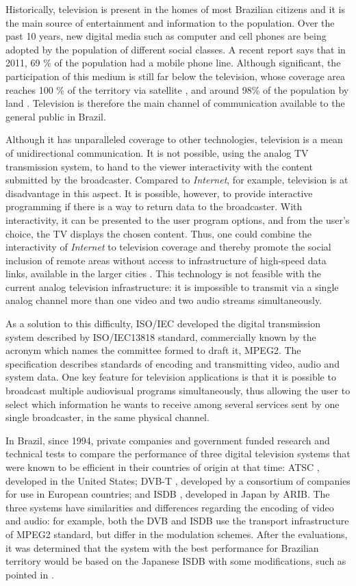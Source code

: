 \documentclass[
	12pt,				%
	openright,			%
	twoside,			%
	a4paper,			%
	brazil,
	french,				%
	english
	]{abntex2}
\begin{document}
Historically, television is present in the homes of most Brazilian citizens and it is the main source of entertainment and information to the population. Over the past 10 years, new digital media such as computer and cell phones are being adopted by the population of different social classes. A recent report \cite{pnad2011} says that in 2011, 69 \% of the population had a mobile phone line. Although significant, the participation of this medium is still far below the television, whose coverage area reaches 100 \% of the territory via satellite \cite{StarOne}, and around 98\% of the population by land \cite{globo}. Television is therefore the main channel of communication available to the general public in Brazil.

Although it has unparalleled coverage to other technologies, television is a mean of unidirectional communication. It is not possible, using the analog TV transmission system, to hand to the viewer interactivity with the content submitted by the broadcaster. Compared to \textit{Internet}, for example, television is at disadvantage in this aspect. It is possible, however, to provide interactive programming if there is a way to return data to the broadcaster. With interactivity, it can be presented to the user program options, and from the user's choice, the TV displays the chosen content. Thus, one could combine the interactivity of \textit{Internet} to television coverage and thereby promote the social inclusion of remote areas without access to infrastructure of high-speed data links, available in the larger cities . This technology is not feasible with the current analog television infrastructure: it is impossible to transmit via a single analog channel more than one video and two audio streams simultaneously.

As a solution to this difficulty, ISO/IEC developed the digital transmission system described by ISO/IEC13818 standard, commercially known by the acronym which names the committee formed to draft it, MPEG2. The specification describes standards of encoding and transmitting video, audio and system data. One key feature for television applications is that it is possible to broadcast multiple audiovisual programs simultaneously, thus allowing the user to select which information he wants to receive among several services sent by one single broadcaster, in the same physical channel.

In Brazil, since 1994, private companies and government funded research and technical tests to compare the performance of three digital television systems that were known to be efficient in their countries of origin at that time: ATSC \cite{ATSC}, developed in the United States; DVB-T \cite{DVB}, developed by a consortium of companies for use in European countries; and ISDB , developed in Japan by ARIB\cite{ARIB}. The three systems have similarities and differences regarding the encoding of video and audio: for example, both the DVB and ISDB use the transport infrastructure of MPEG2 standard, but differ in the modulation schemes. After the evaluations, it was determined that the system with the best performance for Brazilian territory would be based on the Japanese ISDB with some modifications, such as pointed in \cite{decreto8061}.
\end{document}
